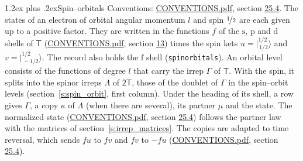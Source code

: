 \documentclass[10pt,a4paper]{article}
\makeatletter
\renewcommand\section{\@startsection{section}{1}{\z@}{-3ex plus -1ex minus -.2ex}%
  {1.2ex plus .2ex}{\normalfont\large\sffamily\bfseries\color{parttitle}}}
\numberwithin{equation}{section}
\newcommand{\grp}[1]{\mathsf{#1}}
\newcommand{\orbital}[1]{\mathrm{#1}}
\newcommand{\mult}{\kappa}
\newcommand{\intx}{\mu}
\newcommand{\jm}[2]{\bigl\lvert{}^{#1}_{\,#2}\bigr\rangle}
\makeatother
\begin{document}
\section{Spin--orbitals}\label{s:spin_orbitals}
Conventions: \href{../../CONVENTIONS.pdf}{CONVENTIONS.pdf}, section \href{../../CONVENTIONS.pdf\#conv.25.4}{25.4}.
\leavevmode\label{n:index.orbital.l}The states of an electron of orbital angular momentum $l$ and spin $\nicefrac{1}{2}$ are each given up to a positive factor. \label{n:local.spinor.uv}\label{n:local.function.f}They are written in the functions $f$ of the $\orbital{s}$, $\orbital{p}$ and $\orbital{d}$ shells of \href{../../../rotation/data/pdf/T.pdf}{$\grp{T}$} (\href{../../CONVENTIONS.pdf}{CONVENTIONS.pdf}, section \href{../../../rotation/CONVENTIONS.pdf\#conv.13}{13}) times the spin kets $u = \jm{1/2}{1/2}$ and $v = \jm{1/2}{-1/2}$. The record also holds the $\orbital{f}$ shell (\texttt{spinorbitals}). An orbital level consists of the functions of degree $l$ that carry the irrep $\Gamma$ of \href{../../../rotation/data/pdf/T.pdf}{$\grp{T}$}. With the spin, it splits into the spinor irreps $\Lambda$ of $\grp{2T}$, those of the doublet of $\Gamma$ in the spin--orbit levels (section~\ref{s:spin_orbit}, first column). \label{n:head.state}Under the heading of its shell, a row gives $\Gamma$, a copy $\mult$ of $\Lambda$ (when there are several), its partner $\intx$ and the state. The normalized state (\href{../../CONVENTIONS.pdf}{CONVENTIONS.pdf}, section \href{../../CONVENTIONS.pdf\#conv.25.4}{25.4}) follows the partner law with the matrices of section~\ref{s:irrep_matrices}. The copies are adapted to time reversal, which sends $f u$ to $f v$ and $f v$ to $-f u$ (\href{../../CONVENTIONS.pdf}{CONVENTIONS.pdf}, section \href{../../CONVENTIONS.pdf\#conv.25.4}{25.4}).
\end{document}
